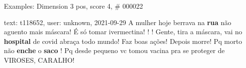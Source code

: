 \begin{frame}{Examples: Dimension 3 pos, score 4, \# 000022}
\footnotesize
\begin{exampleblock}{text: t118652, user: unknown, 2021-09-29}
A mulher hoje berrava na \textbf{rua} não aguento mais máscara! É só tomar 
ivermectina! ! ! Gente, tira a máscara, vai no \textbf{hospital} de covid 
abraça todo mundo! Faz boas ações! Depois morre! Pq morto não \textbf{enche} o 
\textbf{saco} ! Pq desde pequeno vc tomou vacina pra se proteger de VIROSES, 
CARALHO! 
\end{exampleblock}
\end{frame}

